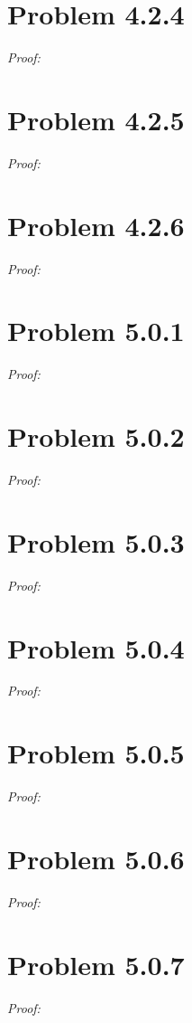 \documentclass[11pt]{article}
\theoremstyle{definition}
\theoremstyle{remark}
\theoremstyle{problem}
\begin{document}
\section{Problem 4.2.4}
\textit{Proof:} 
\newpage

\section{Problem 4.2.5}
\textit{Proof:} 
\newpage

\section{Problem 4.2.6}
\textit{Proof:} 
\newpage

\section{Problem 5.0.1}
\textit{Proof:} 
\newpage

\section{Problem 5.0.2}
\textit{Proof:} 
\newpage

\section{Problem 5.0.3}
\textit{Proof:} 
\newpage

\section{Problem 5.0.4}
\textit{Proof:} 
\newpage

\section{Problem 5.0.5}
\textit{Proof:} 
\newpage

\section{Problem 5.0.6}
\textit{Proof:} 
\newpage

\section{Problem 5.0.7}
\textit{Proof:} 
\newpage
\end{document}
